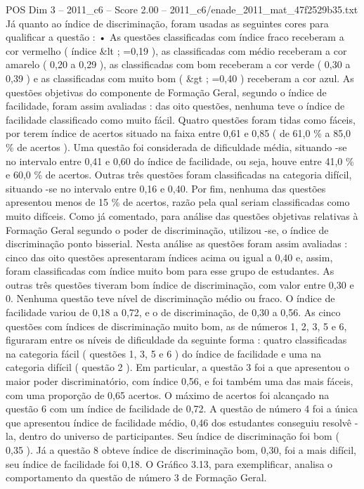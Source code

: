 \begin{textsample}{POS Dim 3 – 2011\_c6 – Score 2.00 – 2011\_c6/enade\_2011\_mat\_47f2529b35.txt}
Já quanto ao índice de discriminação, foram usadas as seguintes cores para qualificar a questão : • As questões classificadas com índice fraco receberam a cor vermelho ( índice \&lt ; =0,19 ), as classificadas com médio receberam a cor amarelo ( 0,20 a 0,29 ), as classificadas com bom receberam a cor verde ( 0,30 a 0,39 ) e as classificadas com muito bom ( \&gt ; =0,40 ) receberam a cor azul.
As questões objetivas do componente de Formação Geral, segundo o índice de facilidade, foram assim avaliadas : das oito questões, nenhuma teve o índice de facilidade classificado como muito fácil.
Quatro questões foram tidas como fáceis, por terem índice de acertos situado na faixa entre 0,61 e 0,85 ( de 61,0 \% a 85,0 \% de acertos ).
Uma questão foi considerada de dificuldade média, situando -se no intervalo entre 0,41 e 0,60 do índice de facilidade, ou seja, houve entre 41,0 \% e 60,0 \% de acertos.
Outras três questões foram classificadas na categoria difícil, situando -se no intervalo entre 0,16 e 0,40.
Por fim, nenhuma das questões apresentou menos de 15 \% de acertos, razão pela qual seriam classificadas como muito difíceis.
Como já comentado, para análise das questões objetivas relativas à Formação Geral segundo o poder de discriminação, utilizou -se, o índice de discriminação ponto bisserial.
Nesta análise as questões foram assim avaliadas : cinco das oito questões apresentaram índices acima ou igual a 0,40 e, assim, foram classificadas com índice muito bom para esse grupo de estudantes.
As outras três questões tiveram bom índice de discriminação, com valor entre 0,30 e 0.
Nenhuma questão teve nível de discriminação médio ou fraco.
O índice de facilidade variou de 0,18 a 0,72, e o de discriminação, de 0,30 a 0,56.
As cinco questões com índices de discriminação muito bom, as de números 1, 2, 3, 5 e 6, figuraram entre os níveis de dificuldade da seguinte forma : quatro classificadas na categoria fácil ( questões 1, 3, 5 e 6 ) do índice de facilidade e uma na categoria difícil ( questão 2 ).
Em particular, a questão 3 foi a que apresentou o maior poder discriminatório, com índice 0,56, e foi também uma das mais fáceis, com uma proporção de 0,65 acertos.
O máximo de acertos foi alcançado na questão 6 com um índice de facilidade de 0,72.
A questão de número 4 foi a única que apresentou índice de facilidade médio, 0,46 dos estudantes conseguiu resolvê -la, dentro do universo de participantes.
Seu índice de discriminação foi bom ( 0,35 ).
Já a questão 8 obteve índice de discriminação bom, 0,30, foi a mais difícil, seu índice de facilidade foi 0,18.
O Gráfico 3.13, para exemplificar, analisa o comportamento da questão de número 3 de Formação Geral.

\end{textsample}
